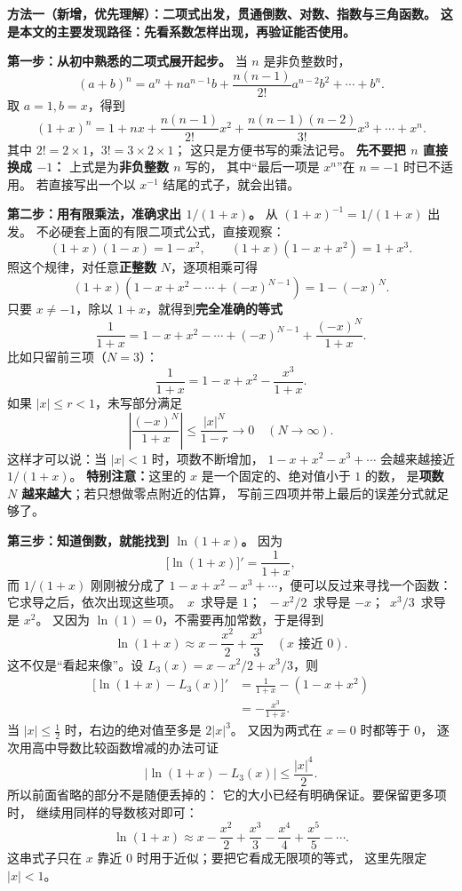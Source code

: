 \clearpage
\begin{proofbox}
\textbf{方法一（新增，优先理解）：二项式出发，贯通倒数、对数、指数与三角函数。}
\textbf{这是本文的主要发现路径：先看系数怎样出现，再验证能否使用。}

\textbf{第一步：从初中熟悉的二项式展开起步。}
当 $n$ 是非负整数时，
\[
 (a+b)^n=a^n+na^{n-1}b+\frac{n(n-1)}{2!}a^{n-2}b^2
 +\cdots+b^n.
\]
取 $a=1,b=x$，得到
\[
 \boxed{(1+x)^n=1+nx+\frac{n(n-1)}{2!}x^2
 +\frac{n(n-1)(n-2)}{3!}x^3+\cdots+x^n.}
\]
其中 $2!=2\times1$，$3!=3\times2\times1$；
这只是方便书写的乘法记号。
\textbf{先不要把 $n$ 直接换成 $-1$：}
上式是为\textbf{非负整数 $n$} 写的，
其中“最后一项是 $x^n$”在 $n=-1$ 时已不适用。
若直接写出一个以 $x^{-1}$ 结尾的式子，就会出错。

\medskip
\textbf{第二步：用有限乘法，准确求出 $1/(1+x)$。}
从 $(1+x)^{-1}=1/(1+x)$ 出发。
不必硬套上面的有限二项式公式，直接观察：
\[
 (1+x)(1-x)=1-x^2,\qquad
 (1+x)(1-x+x^2)=1+x^3.
\]
照这个规律，对任意\textbf{正整数} $N$，逐项相乘可得
\[
 \boxed{(1+x)(1-x+x^2-\cdots+(-x)^{N-1})=1-(-x)^N.}
\]
只要 $x\ne-1$，除以 $1+x$，就得到\textbf{完全准确的等式}
\[
 \boxed{\frac1{1+x}=1-x+x^2-\cdots+(-x)^{N-1}
 +\frac{(-x)^N}{1+x}.}
\]
比如只留前三项（$N=3$）：
\[
 \frac1{1+x}=1-x+x^2-\frac{x^3}{1+x}.
\]
如果 $|x|\le r<1$，未写部分满足
\[
 \left|\frac{(-x)^N}{1+x}\right|
 \le\frac{|x|^N}{1-r}\longrightarrow0\quad(N\to\infty).
\]
这样才可以说：当 $|x|<1$ 时，项数不断增加，
$1-x+x^2-x^3+\cdots$ 会越来越接近 $1/(1+x)$。
\textbf{特别注意：}这里的 $x$ 是一个固定的、绝对值小于 $1$ 的数，
是\textbf{项数 $N$ 越来越大}；若只想做零点附近的估算，
写前三四项并带上最后的误差分式就足够了。

\medskip
\textbf{第三步：知道倒数，就能找到 $\ln(1+x)$。}
因为
\[
 \bigl[\ln(1+x)\bigr]'=\frac1{1+x},
\]
而 $1/(1+x)$ 刚刚被分成了
$1-x+x^2-x^3+\cdots$，便可以反过来寻找一个函数：
它求导之后，依次出现这些项。
$\,x\,$ 求导是 $1$；
$\,-x^2/2\,$ 求导是 $-x$；
$\,x^3/3\,$ 求导是 $x^2$。
又因为 $\ln(1)=0$，不需要再加常数，于是得到
\[
 \boxed{\ln(1+x)\approx x-\frac{x^2}{2}+\frac{x^3}{3}}
 \quad(x\text{ 接近 }0).
\]
这不仅是“看起来像”。设
$L_3(x)=x-x^2/2+x^3/3$，则
\[
 \begin{aligned}
 \bigl[\ln(1+x)-L_3(x)\bigr]'
 &=\frac1{1+x}-(1-x+x^2)\\
 &=-\frac{x^3}{1+x}.
 \end{aligned}
\]
当 $|x|\le\frac12$ 时，右边的绝对值至多是 $2|x|^3$。
又因为两式在 $x=0$ 时都等于 $0$，
逐次用高中导数比较函数增减的办法可证
\[
 \boxed{\left|\ln(1+x)-L_3(x)\right|\le\frac{|x|^4}{2}.}
\]
所以前面省略的部分不是随便丢掉的：
它的大小已经有明确保证。要保留更多项时，
继续用同样的导数核对即可：
\[
 \ln(1+x)\approx x-\frac{x^2}{2}+\frac{x^3}{3}
 -\frac{x^4}{4}+\frac{x^5}{5}-\cdots.
\]
这串式子只在 $x$ 靠近 $0$ 时用于近似；要把它看成无限项的等式，
这里先限定 $|x|<1$。
\end{proofbox}

